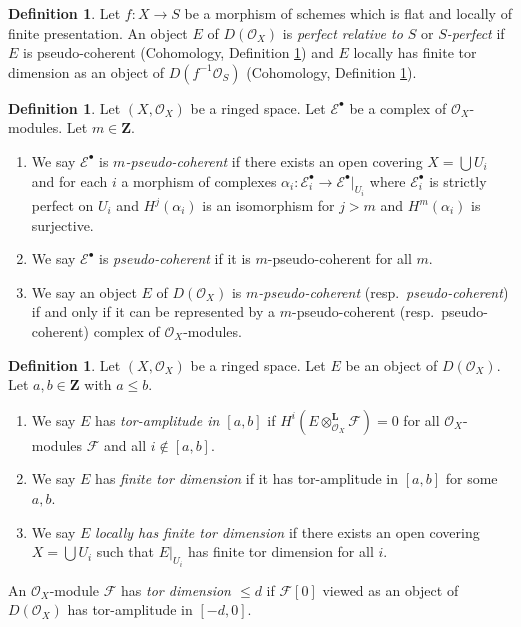\documentclass{amsart}
\theoremstyle{plain}
\theoremstyle{definition}
\newtheorem{definition}[subsection]{Definition}
\theoremstyle{remark}
\numberwithin{equation}{subsection}
\begin{document}
\begin{definition}
\label{perfect-definition-relatively-perfect}
Let $f : X \to S$ be a morphism of schemes which is flat and
locally of finite presentation. An object $E$ of $D(\mathcal{O}_X)$ is
{\it perfect relative to $S$} or
{\it $S$-perfect} if $E$ is pseudo-coherent
(Cohomology, Definition \ref{cohomology-definition-pseudo-coherent}) and
$E$ locally has finite tor dimension as an object of
$D(f^{-1}\mathcal{O}_S)$
(Cohomology, Definition \ref{cohomology-definition-tor-amplitude}).
\end{definition}

\begin{definition}
\label{cohomology-definition-pseudo-coherent}
Let $(X, \mathcal{O}_X)$ be a ringed space. Let $\mathcal{E}^\bullet$
be a complex of $\mathcal{O}_X$-modules. Let $m \in \mathbf{Z}$.
\begin{enumerate}
\item We say $\mathcal{E}^\bullet$ is {\it $m$-pseudo-coherent}
if there exists an open covering $X = \bigcup U_i$ and for each $i$
a morphism of complexes
$\alpha_i : \mathcal{E}_i^\bullet \to \mathcal{E}^\bullet|_{U_i}$
where $\mathcal{E}_i^\bullet$ is strictly perfect on $U_i$ and
$H^j(\alpha_i)$ is an isomorphism for $j > m$ and $H^m(\alpha_i)$
is surjective.
\item We say $\mathcal{E}^\bullet$ is {\it pseudo-coherent}
if it is $m$-pseudo-coherent for all $m$.
\item We say an object $E$ of $D(\mathcal{O}_X)$ is
{\it $m$-pseudo-coherent} (resp.\ {\it pseudo-coherent})
if and only if it can be represented by a $m$-pseudo-coherent
(resp.\ pseudo-coherent) complex of $\mathcal{O}_X$-modules.
\end{enumerate}
\end{definition}

\begin{definition}
\label{cohomology-definition-tor-amplitude}
Let $(X, \mathcal{O}_X)$ be a ringed space.
Let $E$ be an object of $D(\mathcal{O}_X)$.
Let $a, b \in \mathbf{Z}$ with $a \leq b$.
\begin{enumerate}
\item We say $E$ has {\it tor-amplitude in $[a, b]$}
if $H^i(E \otimes_{\mathcal{O}_X}^\mathbf{L} \mathcal{F}) = 0$
for all $\mathcal{O}_X$-modules $\mathcal{F}$ and all $i \not \in [a, b]$.
\item We say $E$ has {\it finite tor dimension}
if it has tor-amplitude in $[a, b]$ for some $a, b$.
\item We say $E$ {\it locally has finite tor dimension}
if there exists an open covering $X = \bigcup U_i$ such that
$E|_{U_i}$ has finite tor dimension for all $i$.
\end{enumerate}
An $\mathcal{O}_X$-module $\mathcal{F}$ has {\it tor dimension $\leq d$}
if $\mathcal{F}[0]$ viewed as an object of $D(\mathcal{O}_X)$ has
tor-amplitude in $[-d, 0]$.
\end{definition}
\end{document}
